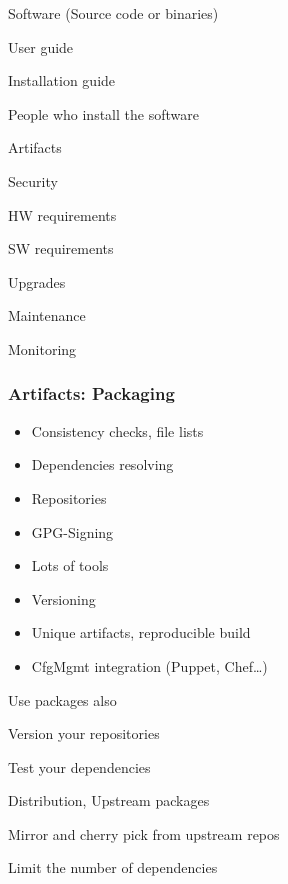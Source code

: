 \begin{iframe}
\item Software (Source code or binaries)
\item User guide
\item Installation guide
\item People who install the software
\end{iframe}

\begin{iframe}
\item Artifacts
\item Security
\item HW requirements
\item SW requirements
\item Upgrades
\item Maintenance
\item Monitoring
\end{iframe}


\begin{frame}
    \frametitle{Artifacts: Packaging}
    \begin{itemize}
        \item {Consistency checks, file lists}
        \item {Dependencies resolving}
        \item {Repositories}
        \item {GPG-Signing}
        \item {Lots of tools}
        \item {Versioning}
        \item {Unique artifacts, reproducible build}
        \item{CfgMgmt integration (Puppet, Chef\dots)}
    \end{itemize}
\end{frame}

\begin{iframe}[Dependencies]
\item{Use packages also}
\item{Version your repositories}
\item{Test your dependencies}
\item{Distribution, Upstream packages}
\item{Mirror and cherry pick from upstream repos}
\item{Limit the number of dependencies}
\end{iframe}



